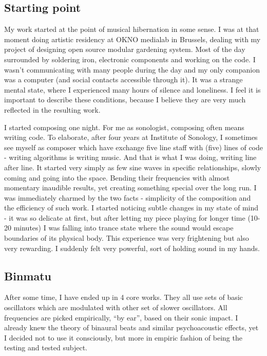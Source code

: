 \documentclass[12pt,a4paper,oneside]{report}
\begin{document}
\subsection{Starting point} My work started at the point of musical hibernation in some sense. I was at that moment doing artistic residency at OKNO medialab in Brussels, dealing with my project of designing open source modular gardening system. Most of the day surrounded by soldering iron, electronic components and working on the code. I wasn't communicating with many people during the day and my only companion was a computer (and social contacts accessible through it). It was a strange mental state, where I experienced many hours of silence and loneliness. I feel it is important to describe these conditions, because I believe they are very much reflected in the resulting work. 

I started composing one night. For me as sonologist, composing often means writing code. To elaborate, after four years at Institute of Sonology, I sometimes see myself as composer which have exchange five line staff with (five) lines of code - writing algorithms is writing music. And that is what I was doing, writing line after line. It started very simply as few sine waves in specific relationships, slowly coming and going into the space. Bending their frequencies with almost momentary inaudible results, yet creating something special over the long run. I was immediately charmed by the two facts - simplicity of the composition and the efficiency of such work. I started noticing subtle changes in my state of mind - it was so delicate at first, but after letting my piece playing for longer time (10-20 minutes) I was falling into trance state where the sound would escape boundaries of its physical body. This experience was very frightening but also very rewarding. I suddenly felt very powerful, sort of holding sound in my hands. 

\subsection{Binmatu} After some time, I have ended up in 4 core works. They all use sets of basic oscillators which are modulated with other set of slower oscillators. All frequencies are picked empirically, ``by ear'', based on their sonic impact. I already knew the theory of binaural beats and similar psychoacoustic effects, yet I decided not to use it consciously, but more in empiric fashion of being the testing and tested subject.
\end{document}
